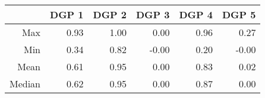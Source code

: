 \begin{table}[ht]
\centering
\begin{tabular}{rrrrrr}
  \hline
 & DGP 1 & DGP 2 & DGP 3 & DGP 4 & DGP 5 \\ 
  \hline
Max & 0.93 & 1.00 & 0.00 & 0.96 & 0.27 \\ 
  Min & 0.34 & 0.82 & -0.00 & 0.20 & -0.00 \\ 
  Mean & 0.61 & 0.95 & 0.00 & 0.83 & 0.02 \\ 
  Median & 0.62 & 0.95 & 0.00 & 0.87 & 0.00 \\ 
   \hline
\end{tabular}
\end{table}
